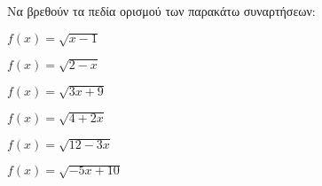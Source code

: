 Να βρεθούν τα πεδία ορισμού των παρακάτω συναρτήσεων:
\begin{alist}
\item $ f(x)=\sqrt{x-1} $
\item $ f(x)=\sqrt{2-x} $
\item $ f(x)=\sqrt{3x+9} $
\item $ f(x)=\sqrt{4+2x} $
\item $ f(x)=\sqrt{12-3x} $
\item $ f(x)=\sqrt{-5x+10} $
\end{alist}
